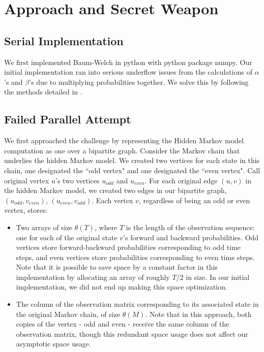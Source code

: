 \section{Approach and Secret Weapon}

\subsection{Serial Implementation}
We first implemented Baum-Welch in python with python package numpy. Our initial implementation ran into serious underflow issues from the calculations of $\alpha$'s and $\beta$'s due to multiplying probabilities together. We solve this by following the methods detailed in \cite{normalizer}. 


\subsection{Failed Parallel Attempt}
We first approached the challenge by representing the Hidden Markov model computation as one over a bipartite graph.  Consider the Markov chain that underlies the hidden Markov model.  We created two vertices for each state in this chain, one designated the ``odd vertex" and one designated the ``even vertex".  Call original vertex $u$'s two vertices $u_{odd}$ and $u_{even}$. For each original edge $(u, v)$ in the hidden Markov model, we created two edges in our bipartite graph, $(u_{odd}, v_{even})$, $(u_{even}, v_{odd})$.   Each vertex $v$, regardless of being an odd or even vertex, stores: 

\begin{itemize}
	\item Two arrays of size $\theta(T)$, where $T$ is the length of the observation sequence: one for each of the original state $v$'s forward and backward probabilities.  Odd vertices store forward-backward probabilities corresponding to odd time steps, and even vertices store probabilities corresponding to even time steps.  Note that it is possible to save space by a constant factor in this implementation by allocating an array of roughly $T/2$ in size.  In our initial implementation, we did not end up making this space optimization.  
	
	\item The column of the observation matrix corresponding to its associated state in the original Markov chain, of size $\theta(M)$.  Note that in this approach, both copies of the vertex - odd and even - receive the same column of the observation matrix, though this redundant space usage does not affect our asymptotic space usage.
\end{itemize}

